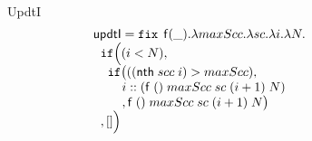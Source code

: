 \documentclass[a4paper,11pt]{article}
\theoremstyle{definition}
\begin{document}
\begin{figure}
\[\begin{array}{l}
\end{array}
\]


UpdtI
\[
\begin{array}{l}
 \mathsf{updtI} = \mathop{\mathtt{fix}} \;  \mathsf{f}(\_). \lambda maxScc. \lambda sc. \lambda
  i. \lambda N. \\
 \hspace{.2cm} \mathtt{if}   \Big (   (i < N)  ,  \\
\hspace{0.4cm}  \mathtt{if} \big( ( ( \mathsf{nth} \; scc \; i)  >  maxScc  ) ,       \\
 \hspace{0.8cm}   i :: ( \mathsf{f}  \; () \; maxScc \; sc
  \; (i+1) \; N  )\\
 \hspace{0.8cm} , \mathsf{f}  \; () \; maxScc \; sc
  \; (i+1) \; N  \big )  \\
\hspace{0.2cm}   ,  [] \Big ) \\
 
\end{array}
\]


\end{figure}
\end{document}
